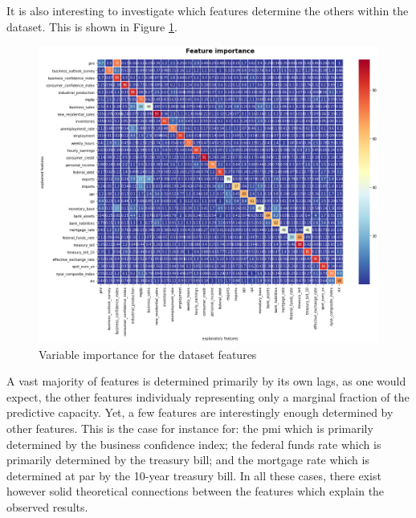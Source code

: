 It is also interesting to investigate which features determine the others within the dataset. This is shown in Figure \ref{fig_c3_s8_ss4_2}.

\begin{figure}[H]
\centering
\includegraphics[scale=0.5]{images/variable_importance_others.png}
\caption{Variable importance for the dataset features}
\label{fig_c3_s8_ss4_2} \vspace{-5mm}
\end{figure}

A vast majority of features is determined primarily by its own lags, as one would expect, the other features individualy representing only a marginal fraction of the predictive capacity. Yet, a few features are interestingly enough determined by other features. This is the case for instance for: the pmi which is primarily determined by the business confidence index; the federal funds rate which is primarily determined by the treasury bill; and the mortgage rate which is determined at par by the 10-year treasury bill. In all these cases, there exist however solid theoretical connections between the features which explain the observed results.


\newpage























